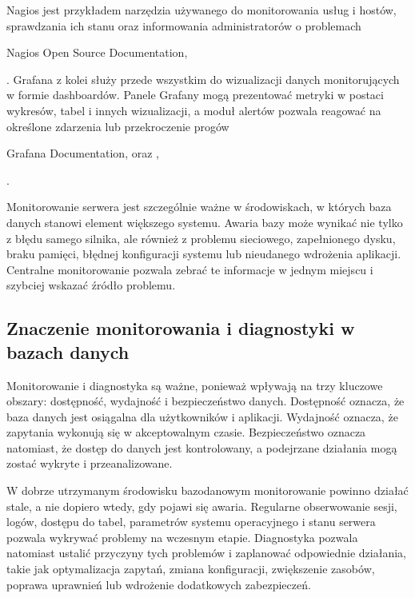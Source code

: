 \documentclass[a4paper,11pt,english,openany,oneside]{sphinxmanual}
\begin{document}
\sphinxAtStartPar
Nagios jest przykładem narzędzia używanego do monitorowania usług i hostów, sprawdzania ich stanu oraz informowania administratorów o problemach %
\begin{footnote}[6]\sphinxAtStartFootnote
Nagios Open Source Documentation, 
%
\end{footnote}. Grafana z kolei służy przede wszystkim do wizualizacji danych monitorujących w formie dashboardów. Panele Grafany mogą prezentować metryki w postaci wykresów, tabel i innych wizualizacji, a moduł alertów pozwala reagować na określone zdarzenia lub przekroczenie progów %
\begin{footnote}[7]\sphinxAtStartFootnote
Grafana Documentation,  oraz , 
%
\end{footnote}.

\sphinxAtStartPar
Monitorowanie serwera jest szczególnie ważne w środowiskach, w których baza danych stanowi element większego systemu. Awaria bazy może wynikać nie tylko z błędu samego silnika, ale również z problemu sieciowego, zapełnionego dysku, braku pamięci, błędnej konfiguracji systemu lub nieudanego wdrożenia aplikacji. Centralne monitorowanie pozwala zebrać te informacje w jednym miejscu i szybciej wskazać źródło problemu.


\subsection{Znaczenie monitorowania i diagnostyki w bazach danych}
\label{\detokenize{rozdzial_2/rozdzial_24/index:znaczenie-monitorowania-i-diagnostyki-w-bazach-danych}}
\sphinxAtStartPar
Monitorowanie i diagnostyka są ważne, ponieważ wpływają na trzy kluczowe obszary: dostępność, wydajność i bezpieczeństwo danych. Dostępność oznacza, że baza danych jest osiągalna dla użytkowników i aplikacji. Wydajność oznacza, że zapytania wykonują się w akceptowalnym czasie. Bezpieczeństwo oznacza natomiast, że dostęp do danych jest kontrolowany, a podejrzane działania mogą zostać wykryte i przeanalizowane.

\sphinxAtStartPar
W dobrze utrzymanym środowisku bazodanowym monitorowanie powinno działać stale, a nie dopiero wtedy, gdy pojawi się awaria. Regularne obserwowanie sesji, logów, dostępu do tabel, parametrów systemu operacyjnego i stanu serwera pozwala wykrywać problemy na wczesnym etapie. Diagnostyka pozwala natomiast ustalić przyczyny tych problemów i zaplanować odpowiednie działania, takie jak optymalizacja zapytań, zmiana konfiguracji, zwiększenie zasobów, poprawa uprawnień lub wdrożenie dodatkowych zabezpieczeń.
\end{document}
